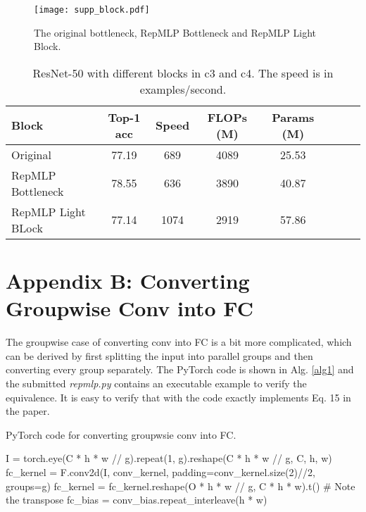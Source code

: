 \documentclass[10pt,twocolumn,letterpaper]{article}
\begin{document}
\begin{figure*}
	\begin{center}
		\texttt{[image: supp\_block.pdf]}
		\vspace{-0.05in}
		\caption{The original bottleneck, RepMLP Bottleneck and RepMLP Light Block.}
		\label{fig-block}
	\end{center}
	\vspace{-0.2in}
\end{figure*}

\setlength{\tabcolsep}{4pt}
\begin{table}
	\caption{ResNet-50 with different blocks in c3 and c4. The speed is in examples/second.}
	\label{table-fast}
	\vspace{-0.25in}
	\begin{center}
		\small
		\begin{tabular}{lccccccc}
			\hline
			Block				&	Top-1 acc	&	Speed	&	FLOPs (M)	&	Params (M)	\\
			\hline
			Original			&		77.19	&	689		&	4089		&	25.53	\\
			RepMLP Bottleneck	&		78.55	&	636		&	3890		&	40.87	\\
			RepMLP Light BLock	&		77.14	&	1074	&	2919		&	57.86	\\
			\hline
		\end{tabular}
	\end{center}
	\vspace{-0.15in}
\end{table}
\setlength{\tabcolsep}{1.4pt}

\section*{Appendix B: Converting Groupwise Conv into FC}

The groupwise case of converting conv into FC is a bit more complicated, which can be derived by first splitting the input into  parallel groups and then converting every group separately. The PyTorch code is shown in Alg. \ref{alg1} and the submitted \textit{repmlp.py} contains an executable example to verify the equivalence. It is easy to verify that with  the code exactly implements Eq. 15 in the paper.

\begin{algorithm*}
	\vskip -0.03in
	\caption{PyTorch code for converting groupwsie conv into FC.}
	\label{alg1}
	\begin{algorithmic}
		\STATE I = torch.eye(C * h * w // g).repeat(1, g).reshape(C * h * w // g, C, h, w)
		\STATE fc\_kernel = F.conv2d(I, conv\_kernel, padding=conv\_kernel.size(2)//2, groups=g)
		\STATE fc\_kernel = fc\_kernel.reshape(O * h * w // g, C * h * w).t()	\# Note the transpose
		\STATE fc\_bias = conv\_bias.repeat\_interleave(h * w)
	\end{algorithmic}
	\vskip -0.03in
\end{algorithm*} 
\end{document}

